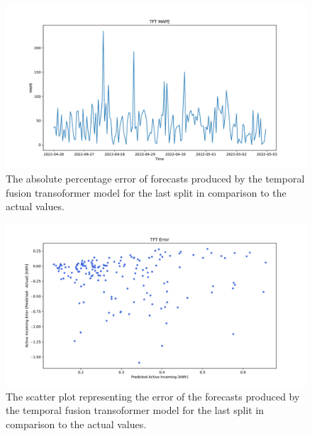 \begin{figure}[H]
\centering
\includegraphics[width=1\textwidth]{images/baseline/TFT_mape}
\caption{The absolute percentage error of forecasts produced by the temporal fusion transoformer model for the last split in comparison to the actual values.}
\label{fig:baselinetfthourlyforecastsmape}
\end{figure}

\begin{figure}[H]
\centering
\includegraphics[width=1\textwidth]{images/baseline/TFT_error_scatter_plot_predicted}
\caption{The scatter plot representing the error of the forecasts produced by the temporal fusion transoformer model for the last split in comparison to the actual values.}
\label{fig:baselinetfthourlyforecastsscatterplot}
\end{figure}

